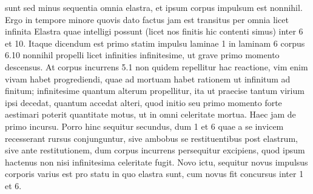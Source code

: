 %
sunt sed minus sequentia omnia elastra\protect{}, et ipsum corpus impulsum est  
%
nonnihil. Ergo in tempore minore quovis dato%
\protect{} factus jam est transitus per omnia licet infinita  
%
Elastra\protect{} quae intelligi possunt (licet nos finitis hic contenti simus) inter 6 et 10.  
%
Itaque dicendum est primo statim impulsu laminae\protect{} 1 in laminam 6 corpus 6.10  
%
nonnihil propelli licet infinities infinitesime, ut grave primo momento descensus.%
\protect{} At corpus incurrens 5.1 non quidem  
%
repellitur hac reactione, vim enim vivam%
\protect{} habet progrediendi,%
\protect{} quae ad mortuam%
\protect{} habet %
rationem ut infinitum ad finitum\protect{}; 
%
%
 infinitesime 
%
%
quantum alterum propellitur, ita ut praecise tantum virium%
\protect{} ipsi decedat, quantum accedat alteri, quod initio seu primo  
%
momento forte aestimari poterit quantitate motus,%
\protect{} ut in omni  
%
celeritate mortua\protect{}. Haec jam de primo  
%
incursu\protect{}. Porro hinc sequitur secundus,%
\protect{} dum 1 et 6 quae 
%
 a se invicem recesserant rursus conjunguntur, sive ambobus se restituentibus post %
elastrum\protect{}, sive ante  
%
restitutionem,\protect{} dum corpus incurrens persequitur excipiens, quod ipsum  
%
hactenus non nisi infinitesima celeritate%
\protect{} fugit. Novo ictu,%
\protect{} sequitur novus impulsus\protect{} corporis 
%
%
varius est pro statu in quo elastra\protect{} sunt, cum novus fit concursus%
\protect{} inter 1 et 6.  
